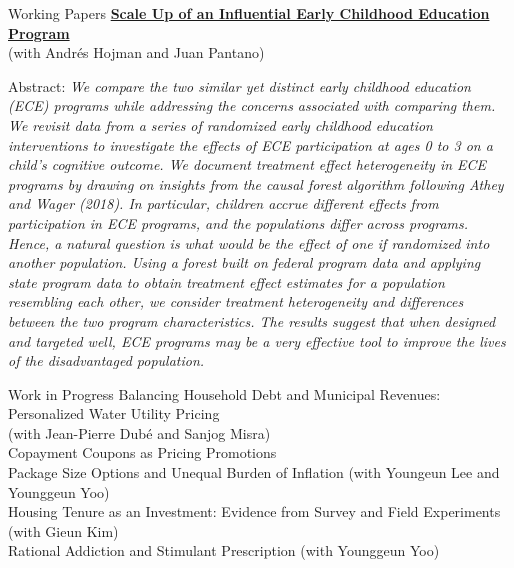 \documentclass{resume} %
\begin{document}
\begin{rSection}{Working Papers}
		\href{chanwoolkim.github.io}{\textbf{Scale Up of an Influential Early Childhood Education Program}} \\ (with Andr\'es Hojman and Juan Pantano)
		
		Abstract: \textit{We compare the two similar yet distinct early childhood education (ECE) programs while addressing the concerns associated with comparing them. We revisit data from a series of randomized early childhood education interventions to investigate the effects of ECE participation at ages 0 to 3 on a child's cognitive outcome. We document treatment effect heterogeneity in ECE programs by drawing on insights from the causal forest algorithm following Athey and Wager (2018). In particular, children accrue different effects from participation in ECE programs, and the populations differ across programs. Hence, a natural question is what would be the effect of one if randomized into another population. Using a forest built on federal program data and applying state program data to obtain treatment effect estimates for a population resembling each other, we consider treatment heterogeneity and differences between the two program characteristics. The results suggest that when designed and targeted well, ECE programs may be a very effective tool to improve the lives of the disadvantaged population.}
	\end{rSection}
	
	\begin{rSection}{Work in Progress}
		Balancing Household Debt and Municipal Revenues: Personalized Water Utility Pricing \\ (with Jean-Pierre Dub\'e and Sanjog Misra) \\
		Copayment Coupons as Pricing Promotions \\
		Package Size Options and Unequal Burden of Inflation (with Youngeun Lee and Younggeun Yoo) \\
		Housing Tenure as an Investment: Evidence from Survey and Field Experiments (with Gieun Kim) \\
		Rational Addiction and Stimulant Prescription (with Younggeun Yoo)
	\end{rSection}
\end{document}
